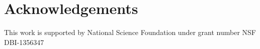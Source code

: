 \documentclass{bmcart}
\begin{document}
\section*{Acknowledgements}

This work is supported by National Science Foundation under grant number NSF
DBI-1356347


\end{document}
